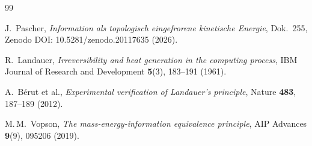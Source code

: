 \begin{thebibliography}{99}

J.~Pascher,
\textit{Information als topologisch eingefrorene kinetische Energie},
Dok.~255, Zenodo DOI: 10.5281/zenodo.20117635 (2026).

R.~Landauer,
\textit{Irreversibility and heat generation in the computing process},
IBM Journal of Research and Development \textbf{5}(3), 183--191 (1961).

A.~Bérut et al.,
\textit{Experimental verification of Landauer's principle},
Nature \textbf{483}, 187--189 (2012).

M.\,M.~Vopson,
\textit{The mass-energy-information equivalence principle},
AIP Advances \textbf{9}(9), 095206 (2019).

\end{thebibliography}
